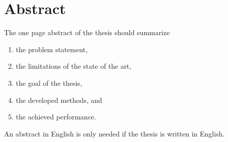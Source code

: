 
\chapter*{Abstract}

The one page abstract of the thesis should summarize 
\begin{enumerate}[i]
\item the problem statement, 
\item the limitations of the state of the art, 
\item the goal of the thesis, 
\item the developed methods, and 
\item the achieved performance.
\end{enumerate}

An abstract in English is only needed if the thesis is written in English.
